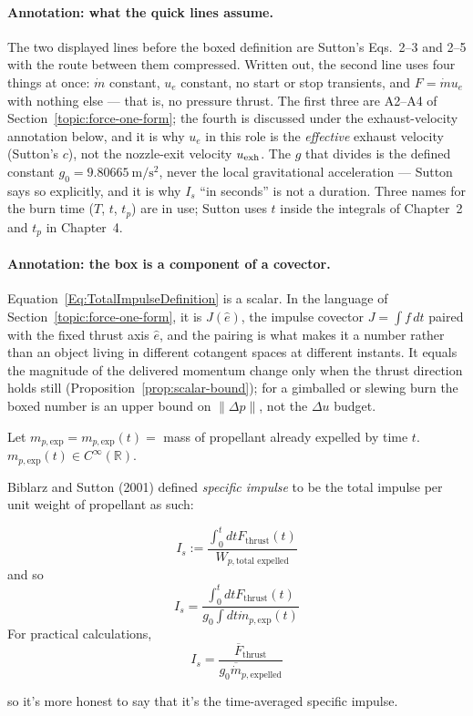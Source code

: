 \paragraph*{Annotation: what the quick lines assume.}
The two displayed lines before the boxed definition are Sutton's Eqs.~2--3
and 2--5 with the route between them compressed. Written out, the second line
uses four things at once: $\dot m$ constant, $u_e$ constant, no start or stop
transients, and $F=\dot m u_e$ with nothing else --- that is, no pressure
thrust. The first three are A2--A4 of Section~\ref{topic:force-one-form}; the
fourth is discussed under the exhaust-velocity annotation below, and it is why
$u_e$ in this role is the \emph{effective} exhaust velocity (Sutton's $c$),
not the nozzle-exit velocity $u_{\rm exh}$. The $g$ that divides is the defined constant
$g_0=9.80665\ \mathrm{m/s^2}$, never the local gravitational acceleration ---
Sutton says so explicitly, and it is why $I_s$ ``in seconds'' is not a
duration. Three names for the burn time ($T$, $t$, $t_p$) are in use;
Sutton uses $t$ inside the integrals of Chapter~2 and $t_p$ in Chapter~4.

\paragraph*{Annotation: the box is a component of a covector.}
Equation~\ref{Eq:TotalImpulseDefinition} is a scalar. In the language of
Section~\ref{topic:force-one-form}, it is $J(\hat e)$, the impulse covector
$J=\int f\,dt$ paired with the fixed thrust axis $\hat e$, and the pairing is
what makes it a number rather than an object living in different cotangent
spaces at different instants. It equals the magnitude of the delivered
momentum change only when the thrust direction holds still
(Proposition~\ref{prop:scalar-bound}); for a gimballed or slewing burn the
boxed number is an upper bound on $\lVert\Delta p\rVert$, not the $\Delta u$
budget.

Let $m_{p, \text{exp}} = m_{p, \text{exp}}(t) = $ mass of propellant already
expelled by time $t$. $m_{p, \text{exp}}(t) \in C^{\infty}(\mathbb{R})$.

Biblarz and Sutton (2001) \cite{GSuttonOBiblarz2001} defined \emph{specific
impulse} to be the total impulse per unit weight of propellant as such:
\begin{definition}
\begin{equation}\label{Eq:SpecificImpulseDefinition}
\boxed{ I_s := \frac{  \int_0^t dt F_{\text{thrust}}(t) }{ W_{p, \text{total expelled} }} }
\end{equation}
and so
\begin{equation}\label{Eq:SpecificImpulseIntegralForm}
I_s = \frac{\int_0^t dt F_{\text{thrust}}(t) }{ g_0 \int dt \dot{m}_{p, \text{exp}}(t)}
\end{equation}
For practical calculations,
\begin{equation}\label{Eq:SpecificImpulsePractical}
I_s = \frac{ \overline{F}_{\text{thrust} } }{ g_0 \overline{\dot{m}}_{p, \text{expelled}}  }
\end{equation}
\end{definition}
so it's more honest to say that it's the time-averaged specific impulse.

